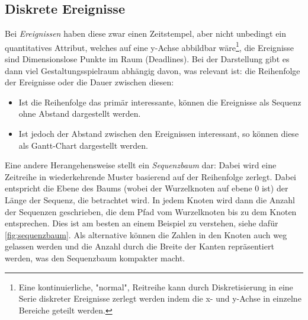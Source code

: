 		\subsection{Diskrete Ereignisse}
			Bei \emph{Ereignissen} haben diese zwar einen Zeitstempel, aber nicht unbedingt ein quantitatives Attribut, welches auf eine y-Achse abbildbar wäre\footnote{Eine kontinuierliche, "normal", Reitreihe kann durch Diskretisierung in eine Serie diskreter Ereignisse zerlegt werden indem die x- und y-Achse in einzelne Bereiche geteilt werden.}, \dh die Ereignisse sind Dimensionslose Punkte im Raum (\bspw Deadlines). Bei der Darstellung gibt es dann viel Gestaltungsspielraum abhängig davon, was relevant ist: die Reihenfolge der Ereignisse oder die Dauer zwischen diesen:
			\begin{itemize}
				\item Ist die Reihenfolge das primär interessante, können die Ereignisse als Sequenz ohne Abstand dargestellt werden.
				\item Ist jedoch der Abstand zwischen den Ereignissen interessant, so können diese als Gantt-Chart dargestellt werden.
			\end{itemize}
			Eine andere Herangehensweise stellt ein \emph{Sequenzbaum} dar: Dabei wird eine Zeitreihe in wiederkehrende Muster basierend auf der Reihenfolge zerlegt. Dabei entspricht die Ebene des Baums (wobei der Wurzelknoten auf ebene 0 ist) der Länge der Sequenz, die betrachtet wird. In jedem Knoten wird dann die Anzahl der Sequenzen geschrieben, die dem Pfad vom Wurzelknoten bis zu dem Knoten entsprechen. Dies ist am besten an einem Beispiel zu verstehen, siehe dafür \autoref{fig:sequenzbaum}. Als alternative können die Zahlen in den Knoten auch weg gelassen werden und die Anzahl durch die Breite der Kanten repräsentiert werden, was den Sequenzbaum kompakter macht.

